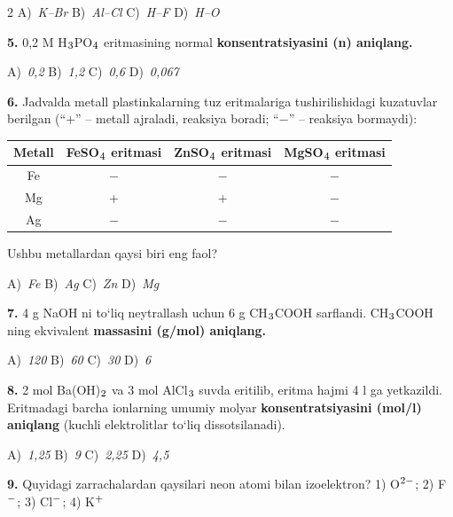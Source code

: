 \documentclass[11pt,a4paper]{article}
\renewcommand{\textsubscript}[1]{\ensuremath{_{\text{\fontsize{8}{8}\selectfont #1}}}}
\renewcommand{\textsuperscript}[1]{\ensuremath{^{\text{\fontsize{8}{8}\selectfont #1}}}}
\begin{document}
\begin{multicols}{2}
\noindent A)~\textsl{K--Br} \hfill B)~\textsl{Al--Cl} \hfill C)~\textsl{H--F} \hfill D)~\textsl{H--O}\par
\vspace{4pt}
\noindent\textbf{5.} 0,2 M H\textsubscript{3}PO\textsubscript{4} eritmasining normal \textbf{konsentratsiyasini (n) aniqlang.}

\noindent A)~\textsl{0,2} \hfill B)~\textsl{1,2} \hfill C)~\textsl{0,6} \hfill D)~\textsl{0,067}\par
\vspace{4pt}
\noindent\textbf{6.} Jadvalda metall plastinkalarning tuz eritmalariga tushirilishidagi kuzatuvlar berilgan (``+'' -- metall ajraladi, reaksiya boradi; ``$-$'' -- reaksiya bormaydi):
\begin{center}
\renewcommand{\arraystretch}{1.15}
\begin{tabular}{|c|c|c|c|}\hline
\textbf{Metall} & \textbf{FeSO\textsubscript{4} eritmasi} & \textbf{ZnSO\textsubscript{4} eritmasi} & \textbf{MgSO\textsubscript{4} eritmasi} \\ \hline
Fe & $-$ & $-$ & $-$ \\ \hline
Mg & + & + & $-$ \\ \hline
Ag & $-$ & $-$ & $-$ \\ \hline
\end{tabular}
\end{center}
Ushbu metallardan qaysi biri eng faol?

\noindent A)~\textsl{Fe} \hfill B)~\textsl{Ag} \hfill C)~\textsl{Zn} \hfill D)~\textsl{Mg}\par
\vspace{4pt}
\noindent\textbf{7.} 4 g NaOH ni to`liq neytrallash uchun 6 g CH\textsubscript{3}COOH sarflandi. CH\textsubscript{3}COOH ning ekvivalent \textbf{massasini (g/mol) aniqlang.}

\noindent A)~\textsl{120} \hfill B)~\textsl{60} \hfill C)~\textsl{30} \hfill D)~\textsl{6}\par
\vspace{4pt}
\noindent\textbf{8.} 2 mol Ba(OH)\textsubscript{2} va 3 mol AlCl\textsubscript{3} suvda eritilib, eritma hajmi 4 l ga yetkazildi. Eritmadagi barcha ionlarning umumiy molyar \textbf{konsentratsiyasini (mol/l) aniqlang} (kuchli elektrolitlar to`liq dissotsilanadi).

\noindent A)~\textsl{1,25} \hfill B)~\textsl{9} \hfill C)~\textsl{2,25} \hfill D)~\textsl{4,5}\par
\vspace{4pt}
\noindent\textbf{9.} Quyidagi zarrachalardan qaysilari neon atomi bilan izoelektron? 1) O\textsuperscript{2$-$}; 2) F\textsuperscript{$-$}; 3) Cl\textsuperscript{$-$}; 4) K\textsuperscript{+}


\end{multicols}
\end{document}
